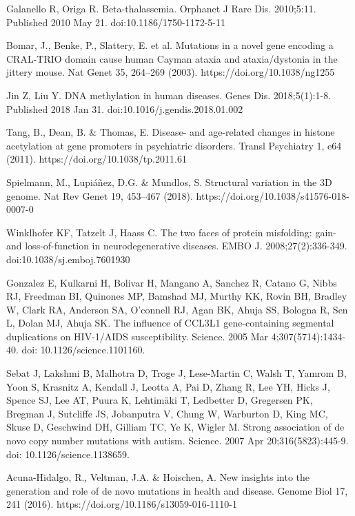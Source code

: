 \documentclass[a4paper,12pt]{article}
\begin{document}
\begin{thebibliography}{100}
Galanello R, Origa R. Beta-thalassemia. Orphanet J Rare Dis. 2010;5:11. Published 2010 May 21. doi:10.1186/1750-1172-5-11

Bomar, J., Benke, P., Slattery, E. et al. Mutations in a novel gene encoding a CRAL-TRIO domain cause human Cayman ataxia and ataxia/dystonia in the jittery mouse. Nat Genet 35, 264–269 (2003). https://doi.org/10.1038/ng1255

Jin Z, Liu Y. DNA methylation in human diseases. Genes Dis. 2018;5(1):1-8. Published 2018 Jan 31. doi:10.1016/j.gendis.2018.01.002

Tang, B., Dean, B. \& Thomas, E. Disease- and age-related changes in histone acetylation at gene promoters in psychiatric disorders. Transl Psychiatry 1, e64 (2011). https://doi.org/10.1038/tp.2011.61

Spielmann, M., Lupiáñez, D.G. \& Mundlos, S. Structural variation in the 3D genome. Nat Rev Genet 19, 453–467 (2018). https://doi.org/10.1038/s41576-018-0007-0

Winklhofer KF, Tatzelt J, Haass C. The two faces of protein misfolding: gain- and loss-of-function in neurodegenerative diseases. EMBO J. 2008;27(2):336-349. doi:10.1038/sj.emboj.7601930

Gonzalez E, Kulkarni H, Bolivar H, Mangano A, Sanchez R, Catano G, Nibbs RJ, Freedman BI, Quinones MP, Bamshad MJ, Murthy KK, Rovin BH, Bradley W, Clark RA, Anderson SA, O'connell RJ, Agan BK, Ahuja SS, Bologna R, Sen L, Dolan MJ, Ahuja SK. The influence of CCL3L1 gene-containing segmental duplications on HIV-1/AIDS susceptibility. Science. 2005 Mar 4;307(5714):1434-40. doi: 10.1126/science.1101160.

Sebat J, Lakshmi B, Malhotra D, Troge J, Lese-Martin C, Walsh T, Yamrom B, Yoon S, Krasnitz A, Kendall J, Leotta A, Pai D, Zhang R, Lee YH, Hicks J, Spence SJ, Lee AT, Puura K, Lehtimäki T, Ledbetter D, Gregersen PK, Bregman J, Sutcliffe JS, Jobanputra V, Chung W, Warburton D, King MC, Skuse D, Geschwind DH, Gilliam TC, Ye K, Wigler M. Strong association of de novo copy number mutations with autism. Science. 2007 Apr 20;316(5823):445-9. doi: 10.1126/science.1138659.

Acuna-Hidalgo, R., Veltman, J.A. \& Hoischen, A. New insights into the generation and role of de novo mutations in health and disease. Genome Biol 17, 241 (2016). https://doi.org/10.1186/s13059-016-1110-1


\end{thebibliography}
\end{document}
